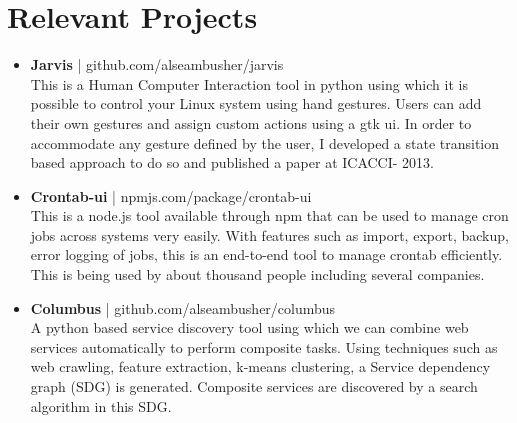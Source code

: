 \documentclass{article} %
\begin{document}
\section{Relevant Projects}
\begin{itemize}
 \item \textbf{Jarvis} | github.com/alseambusher/jarvis\\ 
 This is a Human Computer Interaction tool in python using which it is possible to control your Linux system using hand gestures. Users can add their own gestures and assign custom actions using a gtk ui. In order to accommodate any gesture defined by the user, I developed a state transition based approach to do so and published a paper at ICACCI- 2013. 
 
 \item \textbf{Crontab-ui} | npmjs.com/package/crontab-ui\\
 This is a node.js tool available through npm that can be used to manage cron jobs across systems very easily. With features such as import, export, backup, error logging of jobs, this is an end-to-end tool to manage crontab efficiently. This is being used by about thousand people including several companies.
 
 \item \textbf{Columbus} | github.com/alseambusher/columbus\\
 A python based service discovery tool using which we can combine web services automatically to perform composite tasks. Using techniques such as web crawling, feature extraction, k-means clustering, a Service dependency graph (SDG) is generated. Composite services are discovered by a search algorithm in this SDG.
 

\end{itemize}
\end{document}
